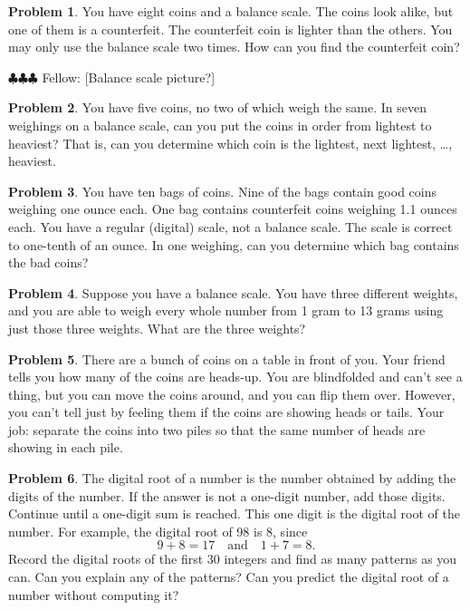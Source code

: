 \documentclass[10pt, reqno]{amsart}
\theoremstyle{remark}
\theoremstyle{definition}
\newtheorem{problem}{Problem}
\numberwithin{equation}{section}  %
\newcommand{\fellow}[1]{{\color{magenta} \sf $\clubsuit\clubsuit\clubsuit$ Fellow: [#1]}}
\begin{document}
\begin{problem}
You have eight coins and a balance scale.  The coins look alike, but one of them is a counterfeit.  The counterfeit coin is lighter than the others.  You may only use the balance scale two times.  How can you find the counterfeit coin?

\fellow{Balance scale picture?}
\end{problem}



\begin{problem}
You have five coins, no two of which weigh the same.  In seven weighings on a balance scale, can you put the coins in order from lightest to heaviest?  That is, can you determine which  coin is the lightest, next lightest, \dots, heaviest.  
\end{problem}

\begin{problem}
You have ten bags of coins.  Nine of the bags contain good coins weighing one ounce each.  One bag contains counterfeit coins weighing 1.1 ounces each.  You have a regular (digital) scale, not a balance scale.  The scale is correct to one-tenth of an ounce.  In one weighing, can you determine which bag contains the bad coins?
\end{problem}

\begin{problem}
Suppose you have a balance scale.  You have three different weights, and you are able to weigh every whole number from 1 gram to 13 grams using just those three weights.  What are the three weights?  
\end{problem}



\begin{problem}
There are a bunch of coins on a table in front of you.  Your friend tells you how many of the coins are heads-up.  You are blindfolded and can't see a thing, but you can move the coins around, and you can flip them over.  However, you can't tell just by feeling them if the coins are showing heads or tails.  Your job: separate the coins into two piles so that the same number of heads are showing in each pile.
\end{problem}


\begin{problem}
The digital root of a number is the number obtained by adding the digits of the number.  If the answer is not a one-digit number, add those digits.  Continue until a one-digit sum is reached.  This one digit is the digital root of the number.  For example, the digital root of 98 is 8, since 
$$
9+8 = 17 \quad \text{and} \quad 1+7 = 8.
$$
Record the digital roots of the first $30$ integers and find as many  patterns as you can.  Can you explain any of the patterns?  Can you predict the digital root of a number without computing it? 
\end{problem}
\end{document}
